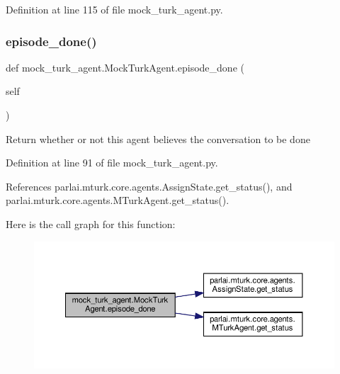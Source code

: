 Definition at line 115 of file mock\+\_\+turk\+\_\+agent.\+py.

\mbox{\label{classmock__turk__agent_1_1MockTurkAgent_a3c083d9aa6c25b0ae0060d35118199a9}} 
\subsubsection{\texorpdfstring{episode\+\_\+done()}{episode\_done()}}
{\footnotesize\ttfamily def mock\+\_\+turk\+\_\+agent.\+Mock\+Turk\+Agent.\+episode\+\_\+done (\begin{DoxyParamCaption}\item[{}]{self }\end{DoxyParamCaption})}

\begin{DoxyVerb}Return whether or not this agent believes the conversation to
be done\end{DoxyVerb}
 

Definition at line 91 of file mock\+\_\+turk\+\_\+agent.\+py.



References parlai.\+mturk.\+core.\+agents.\+Assign\+State.\+get\+\_\+status(), and parlai.\+mturk.\+core.\+agents.\+M\+Turk\+Agent.\+get\+\_\+status().

Here is the call graph for this function\+:
\nopagebreak
\begin{figure}[H]
\begin{center}
\leavevmode
\includegraphics[width=350pt]{classmock__turk__agent_1_1MockTurkAgent_a3c083d9aa6c25b0ae0060d35118199a9_cgraph}
\end{center}
\end{figure}
\mbox{\label{classmock__turk__agent_1_1MockTurkAgent_a614d570506381e5be546491435146d93}} 
